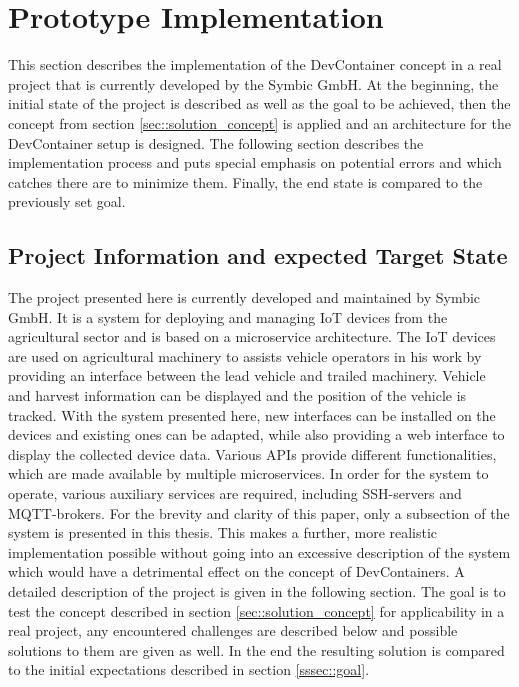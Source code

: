 
\section{Prototype Implementation}\label{sec::solution_code}
This section describes the implementation of the DevContainer concept in a real project that is currently developed by the Symbic GmbH. At the beginning, the initial state of the project is described as well as the goal to be achieved, then the concept from section \ref{sec::solution_concept} is applied and an architecture for the DevContainer setup is designed. The following section describes the implementation process and puts special emphasis on potential errors and which catches there are to minimize them. Finally, the end state is compared to the previously set goal.

    \subsection{Project Information and expected Target State}
    The project presented here is currently developed and maintained by Symbic GmbH. It is a system for deploying and managing \ac{IoT} devices from the agricultural sector and is based on a microservice architecture. The \ac{IoT} devices are used on agricultural machinery to assists vehicle operators in his work by providing an interface between the lead vehicle and trailed machinery. Vehicle and harvest information can be displayed and the position of the vehicle is tracked. With the system presented here, new interfaces can be installed on the devices and existing ones can be adapted, while also providing a web interface to display the collected device data. Various \ac{API}s provide different functionalities, which are made available by multiple microservices. In order for the system to operate, various auxiliary services are required, including \ac{SSH}-servers and MQTT-brokers. For the brevity and clarity of this paper, only a subsection of the system is presented in this thesis. This makes a further, more realistic implementation possible without going into an excessive description of the system which would have a detrimental effect on the concept of DevContainers. A detailed description of the project is given in the following section. \newline
    The goal is to test the concept described in section \ref{sec::solution_concept} for applicability in a real project, any encountered challenges are described below and possible solutions to them are given as well. In the end the resulting solution is compared to the initial expectations described in section \ref{sssec::goal}.

